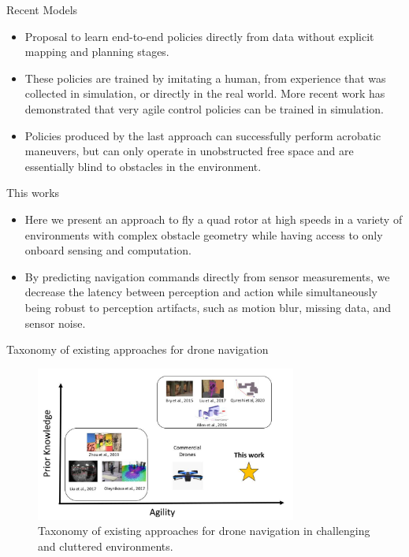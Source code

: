 \documentclass{beamer}
\begin{document}
\begin{frame}{Recent Models}
	\begin{itemize}
		\item Proposal to learn end-to-end policies directly from data without explicit mapping and planning stages. 
		\item These policies are trained by imitating a human, from experience that was collected in simulation, or directly in the real world. More recent work has demonstrated that very agile control policies can be trained in simulation. 
		\item Policies produced by the last approach can successfully perform acrobatic maneuvers, but can only operate in unobstructed free space and are essentially blind to obstacles in the environment.
	\end{itemize}
\end{frame}

\begin{frame}{This works}
	\begin{itemize}
		\item Here we present an approach to fly a quad rotor at high speeds in a variety of environments with complex obstacle geometry while having access to only onboard sensing and computation. 
		\item By predicting navigation commands directly from sensor measurements, we decrease the latency between perception and action while simultaneously being robust to perception artifacts, such as motion blur, missing data, and sensor noise.
	\end{itemize}
	
\end{frame}

\begin{frame}{Taxonomy of existing approaches for drone navigation}
	\centering
	\begin{figure}
		\includegraphics[height=2in]{images/taxonomy_navigation.png}
		\caption{Taxonomy of existing approaches for drone navigation in challenging and cluttered environments.}
	\end{figure}
\end{frame}
\end{document}
